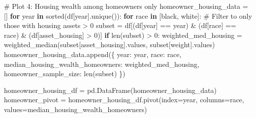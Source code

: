 \documentclass[
  letterpaper,
  DIV=11,
  numbers=noendperiod]{scrartcl}
\newenvironment{Shaded}{\begin{snugshade}}{\end{snugshade}}
\newcommand{\BuiltInTok}[1]{\textcolor[rgb]{0.00,0.23,0.31}{#1}}
\newcommand{\CommentTok}[1]{\textcolor[rgb]{0.37,0.37,0.37}{#1}}
\newcommand{\ControlFlowTok}[1]{\textcolor[rgb]{0.00,0.23,0.31}{\textbf{#1}}}
\newcommand{\DecValTok}[1]{\textcolor[rgb]{0.68,0.00,0.00}{#1}}
\newcommand{\KeywordTok}[1]{\textcolor[rgb]{0.00,0.23,0.31}{\textbf{#1}}}
\newcommand{\NormalTok}[1]{\textcolor[rgb]{0.00,0.23,0.31}{#1}}
\newcommand{\OperatorTok}[1]{\textcolor[rgb]{0.37,0.37,0.37}{#1}}
\newcommand{\StringTok}[1]{\textcolor[rgb]{0.13,0.47,0.30}{#1}}
\begin{document}
\begin{Shaded}
\begin{Highlighting}[]
\CommentTok{\# Plot 4: Housing wealth among homeowners only}
\NormalTok{homeowner\_housing\_data }\OperatorTok{=}\NormalTok{ []}
\ControlFlowTok{for}\NormalTok{ year }\KeywordTok{in} \BuiltInTok{sorted}\NormalTok{(df[}\StringTok{\textquotesingle{}year\textquotesingle{}}\NormalTok{].unique()):}
    \ControlFlowTok{for}\NormalTok{ race }\KeywordTok{in}\NormalTok{ [}\StringTok{\textquotesingle{}black\textquotesingle{}}\NormalTok{, }\StringTok{\textquotesingle{}white\textquotesingle{}}\NormalTok{]:}
        \CommentTok{\# Filter to only those with housing assets \textgreater{} 0}
\NormalTok{        subset }\OperatorTok{=}\NormalTok{ df[(df[}\StringTok{\textquotesingle{}year\textquotesingle{}}\NormalTok{] }\OperatorTok{==}\NormalTok{ year) }\OperatorTok{\&}\NormalTok{ (df[}\StringTok{\textquotesingle{}race\textquotesingle{}}\NormalTok{] }\OperatorTok{==}\NormalTok{ race) }\OperatorTok{\&}\NormalTok{ (df[}\StringTok{\textquotesingle{}asset\_housing\textquotesingle{}}\NormalTok{] }\OperatorTok{\textgreater{}} \DecValTok{0}\NormalTok{)]}
        \ControlFlowTok{if} \BuiltInTok{len}\NormalTok{(subset) }\OperatorTok{\textgreater{}} \DecValTok{0}\NormalTok{:}
\NormalTok{            weighted\_med\_housing }\OperatorTok{=}\NormalTok{ weighted\_median(subset[}\StringTok{\textquotesingle{}asset\_housing\textquotesingle{}}\NormalTok{].values, subset[}\StringTok{\textquotesingle{}weight\textquotesingle{}}\NormalTok{].values)}
\NormalTok{            homeowner\_housing\_data.append(\{}
                \StringTok{\textquotesingle{}year\textquotesingle{}}\NormalTok{: year,}
                \StringTok{\textquotesingle{}race\textquotesingle{}}\NormalTok{: race,}
                \StringTok{\textquotesingle{}median\_housing\_wealth\_homeowners\textquotesingle{}}\NormalTok{: weighted\_med\_housing,}
                \StringTok{\textquotesingle{}homeowner\_sample\_size\textquotesingle{}}\NormalTok{: }\BuiltInTok{len}\NormalTok{(subset)}
\NormalTok{            \})}

\NormalTok{homeowner\_housing\_df }\OperatorTok{=}\NormalTok{ pd.DataFrame(homeowner\_housing\_data)}
\NormalTok{homeowner\_pivot }\OperatorTok{=}\NormalTok{ homeowner\_housing\_df.pivot(index}\OperatorTok{=}\StringTok{\textquotesingle{}year\textquotesingle{}}\NormalTok{, columns}\OperatorTok{=}\StringTok{\textquotesingle{}race\textquotesingle{}}\NormalTok{, values}\OperatorTok{=}\StringTok{\textquotesingle{}median\_housing\_wealth\_homeowners\textquotesingle{}}\NormalTok{)}


\end{Highlighting}
\end{Shaded}
\end{document}
